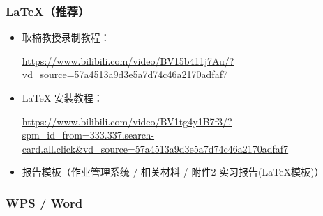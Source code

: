\subsubsection{\LaTeX（推荐）}
\begin{itemize}
	\item 耿楠教授录制教程：
	
	\url{https://www.bilibili.com/video/BV15b411j7Au/?vd_source=57a4513a9d3e5a7d74c46a2170adfaf7}
	
	\item LaTeX 安装教程：
	
	\url{https://www.bilibili.com/video/BV1tg4y1B7f3/?spm_id_from=333.337.search-card.all.click&vd_source=57a4513a9d3e5a7d74c46a2170adfaf7}
	
	\item 报告模板（作业管理系统 / 相关材料 / 附件2-实习报告(LaTeX模板)）
\end{itemize}

\subsubsection{WPS / Word}
